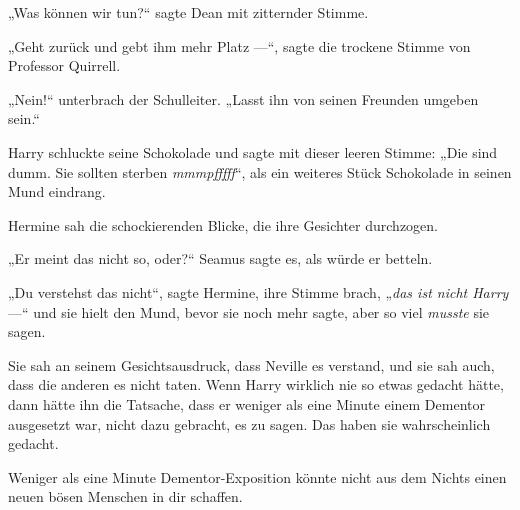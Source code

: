 „Was können wir tun?“ sagte Dean mit zitternder Stimme.

„Geht zurück und gebt ihm mehr Platz —“, sagte die trockene Stimme von Professor Quirrell.

„Nein!“ unterbrach der Schulleiter.
„Lasst ihn von seinen Freunden umgeben sein.“

Harry schluckte seine Schokolade und sagte mit dieser leeren Stimme:
„Die sind dumm. Sie sollten sterben \emph{mmmpfffff}“, als ein weiteres Stück Schokolade in seinen Mund eindrang.

Hermine sah die schockierenden Blicke, die ihre Gesichter durchzogen.

„Er meint das nicht so, oder?“ Seamus sagte es, als würde er betteln.

„Du verstehst das nicht“, sagte Hermine, ihre Stimme brach,
„\emph{das ist nicht Harry} —“ und sie hielt den Mund, bevor sie noch mehr sagte, aber so viel \emph{musste} sie sagen.

Sie sah an seinem Gesichtsausdruck, dass Neville es verstand, und sie sah auch, dass die anderen es nicht taten. Wenn Harry wirklich nie so etwas gedacht hätte, dann hätte ihn die Tatsache, dass er weniger als eine Minute einem Dementor ausgesetzt war, nicht dazu gebracht, es zu sagen. Das haben sie wahrscheinlich gedacht.

Weniger als eine Minute Dementor-Exposition könnte nicht aus dem Nichts einen neuen bösen Menschen in dir schaffen.

